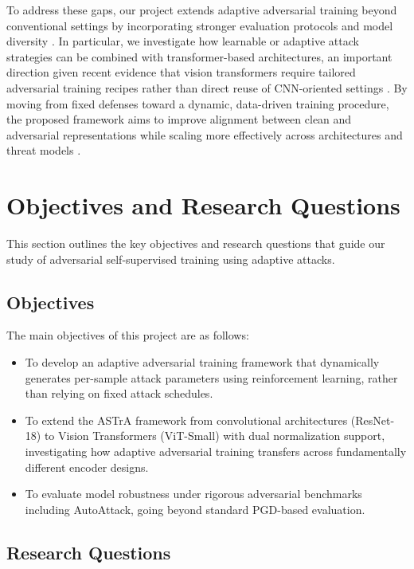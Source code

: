 \documentclass[conference]{IEEEtran}
\begin{document}
To address these gaps, our project extends adaptive adversarial training beyond conventional settings by incorporating stronger evaluation protocols and model diversity \cite{b5}. In particular, we investigate how learnable or adaptive attack strategies can be combined with transformer-based architectures, an important direction given recent evidence that vision transformers require tailored adversarial training recipes rather than direct reuse of CNN-oriented settings \cite{b6}. By moving from fixed defenses toward a dynamic, data-driven training procedure, the proposed framework aims to improve alignment between clean and adversarial representations while scaling more effectively across architectures and threat models \cite{b1,b2,b3}.

\section{Objectives and Research Questions}

This section outlines the key objectives and research questions that guide our study of adversarial self-supervised training using adaptive attacks.

\subsection{Objectives}

The main objectives of this project are as follows:

\begin{itemize}
    \item To develop an adaptive adversarial training framework that dynamically generates per-sample attack parameters using reinforcement learning, rather than relying on fixed attack schedules.

    \item To extend the ASTrA framework from convolutional architectures (ResNet-18) to Vision Transformers (ViT-Small) with dual normalization support, investigating how adaptive adversarial training transfers across fundamentally different encoder designs.

    \item To evaluate model robustness under rigorous adversarial benchmarks including AutoAttack, going beyond standard PGD-based evaluation.
\end{itemize}

\subsection{Research Questions}
\end{document}

